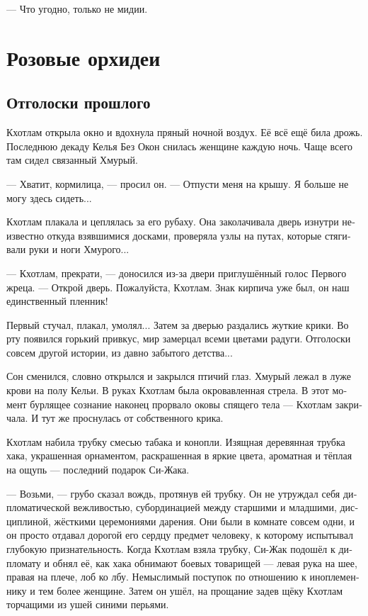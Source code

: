 \documentclass[a4paper,12pt,fleqn]{book}\usepackage{cooltooltips}\usepackage{polyglossia}\setdefaultlanguage{russian}\setotherlanguage{english}\defaultfontfeatures{Ligatures=TeX,Mapping=tex-text} \usepackage{xcolor}\definecolor{lightgray}{HTML}{bbbbbb}\color{lightgray}\newcommand{\ml}[3]{\textenglish{\textcolor{black}{#3}}}
\begin{document}
--- Что угодно, только не мидии.

\chapter{Розовые орхидеи}

\section{Отголоски прошлого}

Кхотлам открыла окно и вдохнула пряный ночной воздух.
Её всё ещё била дрожь.
Последнюю декаду Келья Без Окон снилась женщине каждую ночь.
Чаще всего там сидел связанный Хмурый.

--- Хватит, кормилица, --- просил он.
--- Отпусти меня на крышу.
Я больше не могу здесь сидеть...

Кхотлам плакала и цеплялась за его рубаху.
Она заколачивала дверь изнутри неизвестно откуда взявшимися досками, проверяла узлы на путах, которые стягивали руки и ноги Хмурого...

--- Кхотлам, прекрати, --- доносился из-за двери приглушённый голос Первого жреца.
--- Открой дверь.
Пожалуйста, Кхотлам.
Знак кирпича уже был, он наш единственный пленник!

Первый стучал, плакал, умолял...
Затем за дверью раздались жуткие крики.
Во рту появился горький привкус, мир замерцал всеми цветами радуги.
Отголоски совсем другой истории, из давно забытого детства...

Сон сменился, словно открылся и закрылся птичий глаз.
Хмурый лежал в луже крови на полу Кельи.
В руках Кхотлам была окровавленная стрела.
В этот момент бурлящее сознание наконец прорвало оковы спящего тела --- Кхотлам закричала.
И тут же проснулась от собственного крика.

Кхотлам набила трубку смесью табака и конопли.
Изящная деревянная трубка хака, украшенная орнаментом, раскрашенная в яркие цвета, ароматная и тёплая на ощупь --- последний подарок Си-Жака.

--- Возьми, --- грубо сказал вождь, протянув ей трубку.
Он не утруждал себя дипломатической вежливостью, субординацией между старшими и младшими, дисциплиной, жёсткими церемониями дарения.
Они были в комнате совсем одни, и он просто отдавал дорогой его сердцу предмет человеку, к которому испытывал глубокую признательность.
Когда Кхотлам взяла трубку, Си-Жак подошёл к дипломату и обнял её, как хака обнимают боевых товарищей --- левая рука на шее, правая на плече, лоб ко лбу.
Немыслимый поступок по отношению к иноплеменнику и тем более женщине.
Затем он ушёл, на прощание задев щёку Кхотлам торчащими из ушей синими перьями.
\end{document}
